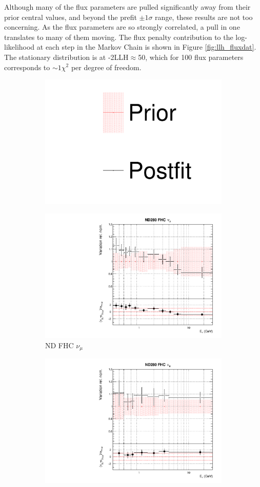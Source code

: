 Although many of the flux parameters are pulled significantly away from their prior central values, and beyond the prefit $\pm1\sigma$ range, these results are not too concerning. As the flux parameters are so strongly correlated, a pull in one translates to many of them moving. The flux penalty contribution to the log-likelihood at each step in the Markov Chain is shown in Figure \ref{fig:llh_fluxdat}. The stationary distribution is at -2LLH$\approx$50, which for 100 flux parameters corresponds to $\sim1\chi^2$ per degree of freedom.

\begin{figure}
\centering
\begin{subfigure}{0.95\textwidth}
  \centering
  \includegraphics[width=0.24\linewidth]{figs/dat_leg}
  \caption{}
  \label{fig:}
\end{subfigure}
\begin{subfigure}{0.24\textwidth}
  \centering
  \includegraphics[width=0.95\linewidth]{figs/datflux0}
  \caption{ND FHC $\nu_{\mu}$}
  \label{fig:}
\end{subfigure}
\begin{subfigure}{0.24\textwidth}
  \centering
  \includegraphics[width=0.95\linewidth]{figs/datflux1}

\end{subfigure}
\end{figure}
